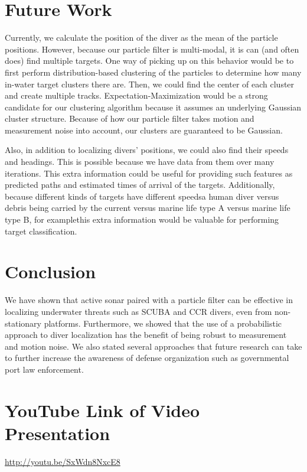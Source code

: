 \documentclass{article} %
\begin{document}
\section{Future Work}
Currently, we calculate the position of the diver as the mean of the particle positions. However, because our particle filter is multi-modal, it is can (and often does) find multiple targets. One way of picking up on this behavior would be to first perform distribution-based clustering of the particles to determine how many in-water target clusters there are. Then, we could find the center of each cluster and create multiple tracks. Expectation-Maximization would be a strong candidate for our clustering algorithm because it assumes an underlying Gaussian cluster structure. Because of how our particle filter takes motion and measurement noise into account, our clusters are guaranteed to be Gaussian.

Also, in addition to localizing divers' positions, we could also find their speeds and headings. This is possible because we have data from them over many iterations. This extra information could be useful for providing such features as predicted paths and estimated times of arrival of the targets. Additionally, because different kinds of targets have different speeds\textemdash a human diver versus debris being carried by the current versus marine life type A versus marine life type B, for example\textemdash this extra information would be valuable for performing target classification.

\section{Conclusion}
We have shown that active sonar paired with a particle filter can be effective in localizing underwater threats such as SCUBA and CCR divers, even from non-stationary platforms. Furthermore, we showed that the use of a probabilistic approach to diver localization has the benefit of being robust to measurement and motion noise. We also stated several approaches that future research can take to further increase the awareness of defense organization such as governmental port law enforcement.

\section*{YouTube Link of Video Presentation}
\url{http://youtu.be/SxWdn8NxcE8}
\end{document}
